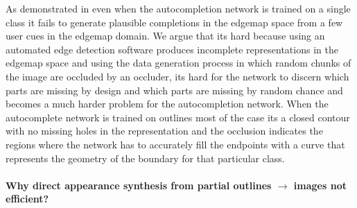 As demonstrated in  even when the autocompletion network is trained on a single class it fails to generate plausible completions in the edgemap space from a few user cues in the edgemap domain. We argue that its hard because using an automated edge detection software produces incomplete representations in the edgemap space and using the data generation process in which random chunks of the image are occluded by an occluder, its hard for the network to discern which parts are missing by design and which parts are missing by random chance and becomes a much harder problem for the autocompletion network. When the autocomplete network is trained on outlines most of the case its a closed contour with no missing holes in the representation and the occlusion indicates the regions where the network has to accurately fill the endpoints with a curve that represents the geometry of the boundary for that particular class.

\paragraph{Why direct appearance synthesis from partial outlines $\rightarrow$ images not efficient?}




